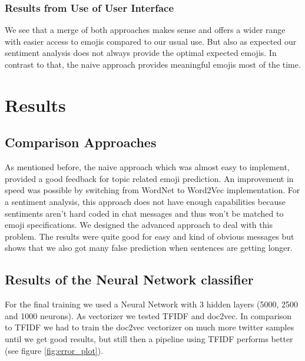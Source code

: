 \documentclass{article}
\begin{document}
\subsubsection{Results from Use of User Interface}
We see that a merge of both approaches makes sense and offers a wider range with easier access to emojis compared to our usual use. But also as expected our sentiment analysis does not always provide the optimal expected emojis. In contrast to that, the naive approach provides meaningful emojis most of the time.

\section{Results}

\subsection{Comparison Approaches}
As mentioned before, the naive approach which was almost easy to implement, provided a good feedback for topic related emoji prediction. An improvement in speed was possible by switching from WordNet to Word2Vec implementation. For a sentiment analysis, this approach does not have enough capabilities because sentiments aren't hard coded in chat messages and thus won't be matched to emoji specifications. We designed the advanced approach to deal with this problem. The results were quite good for easy and kind of obvious messages but shows that we also got many false prediction when sentences are getting longer.

\subsection{Results of the Neural Network classifier}

For the final training we used a Neural Network with 3 hidden layers (5000, 2500 and 1000 neurons). As vectorizer we tested TFIDF and doc2vec. In comparison to TFIDF we had to train the doc2vec vectorizer on much more twitter samples until we get good results, but still then a pipeline using TFIDF performs better (see figure \ref{fig:error_plot}).
\end{document}
